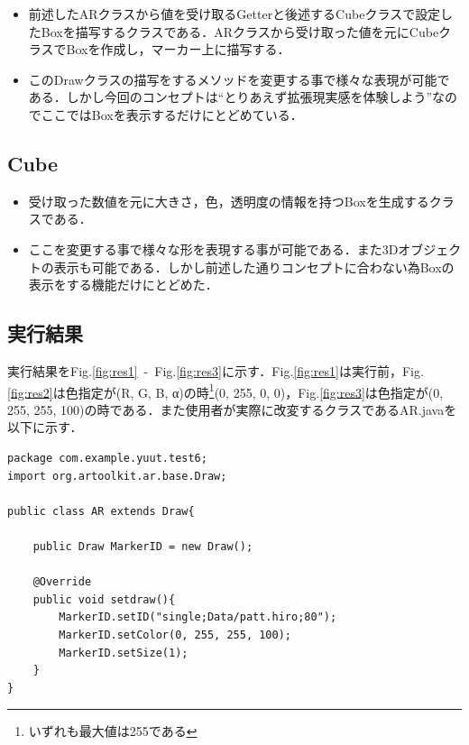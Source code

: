 \begin{itemize}
 \item 前述したARクラスから値を受け取るGetterと後述するCubeクラスで設定したBoxを描写するクラスである．ARクラスから受け取った値を元にCubeクラスでBoxを作成し，マーカー上に描写する．
 \item このDrawクラスの描写をするメソッドを変更する事で様々な表現が可能である．しかし今回のコンセプトは``とりあえず拡張現実感を体験しよう''なのでここではBoxを表示するだけにとどめている．
\end{itemize}

\subsection{Cube}
\begin{itemize}
 \item 受け取った数値を元に大きさ，色，透明度の情報を持つBoxを生成するクラスである．
 \item ここを変更する事で様々な形を表現する事が可能である．また3Dオブジェクトの表示も可能である．しかし前述した通りコンセプトに合わない為Boxの表示をする機能だけにとどめた．
\end{itemize}

\subsection{実行結果}
実行結果をFig.\ref{fig:res1}~-~Fig.\ref{fig:res3}に示す．Fig.\ref{fig:res1}は実行前，Fig.\ref{fig:res2}は色指定が(R, G, B, α)の時\footnote{いずれも最大値は255である}(0, 255, 0, 0)，Fig.\ref{fig:res3}は色指定が(0, 255, 255, 100)の時である．また使用者が実際に改変するクラスであるAR.javaを以下に示す．

\begin{lstlisting}
package com.example.yuut.test6;
import org.artoolkit.ar.base.Draw;

public class AR extends Draw{

	public Draw MarkerID = new Draw();

	@Override
	public void setdraw(){
		MarkerID.setID("single;Data/patt.hiro;80");
		MarkerID.setColor(0, 255, 255, 100);
		MarkerID.setSize(1);
	}
}
\end{lstlisting}

